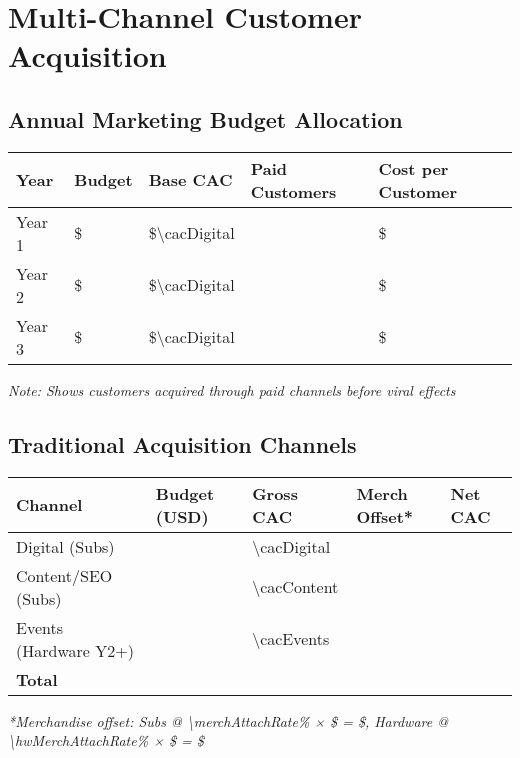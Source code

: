 
\section{Multi-Channel Customer Acquisition}

\subsection{Annual Marketing Budget Allocation}
\begin{table}[H]
\centering
\begin{tabularx}{\linewidth}{l Y Y Y Y}
\toprule
Year & Budget & Base CAC & Paid Customers & Cost per Customer \\\midrule
Year 1 & \$\numint{\marketingBudgetYearOne} & \$\num{\cacDigital} & \numint{\baseNewSubsYearOne} & \$\numint{\cacDigital} \\
Year 2 & \$\numint{\marketingBudgetYearTwo} & \$\num{\cacDigital} & \numint{\baseNewSubsYearTwo} & \$\numint{\cacDigital} \\
Year 3 & \$\numint{\marketingBudgetYearThree} & \$\num{\cacDigital} & \numint{\baseNewSubsYearThree} & \$\numint{\cacDigital} \\
\bottomrule
\end{tabularx}
\end{table}
\textit{Note: Shows customers acquired through paid channels before viral effects}

\subsection{Traditional Acquisition Channels}
\begin{table}[H]
\centering
\begin{tabularx}{\linewidth}{l Y Y Y Y}
\toprule
Channel & Budget (USD) & Gross CAC\cite{authoranalysis2024} & Merch Offset* & Net CAC \\\midrule
Digital (Subs) & \numint{\budgetDigital} & \num{\cacDigital} & \numfpeval{\merchOffsetSubsCalc} & \numfpeval{\cacDigital - \merchOffsetSubsCalc} \\
Content/SEO (Subs) & \numint{\budgetContent} & \num{\cacContent} & \numfpeval{\merchOffsetSubsCalc} & \numfpeval{\cacContent - \merchOffsetSubsCalc} \\
Events (Hardware Y2+) & \numint{\budgetEvents} & \num{\cacEvents} & \numfpeval{\merchOffsetHwCalc} & \numfpeval{\cacEvents - \merchOffsetHwCalc} \\\midrule
\textbf{Total} & \textbf{} &  &  &  \\
\bottomrule
\end{tabularx}
\end{table}
\textit{*Merchandise offset: Subs @ \num{\merchAttachRate}\% × \$\numfpeval{\merchAvgProfit} = \$\numfpeval{\merchOffsetSubsCalc}, Hardware @ \num{\hwMerchAttachRate}\% × \$\numfpeval{\merchAvgProfit} = \$\numfpeval{\merchOffsetHwCalc}}

